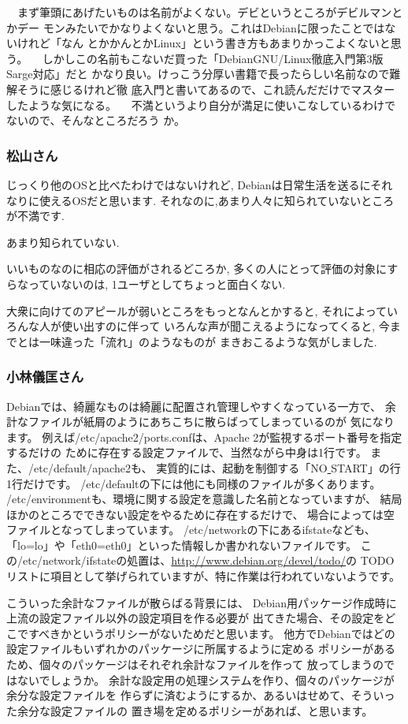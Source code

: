 \documentclass[mingoth]{jsarticle}
\begin{document}
　まず筆頭にあげたいものは名前がよくない。デビというところがデビルマンとかデー
モンみたいでかなりよくないと思う。これはDebianに限ったことではないけれど「なん
とかかんとかLinux」という書き方もあまりかっこよくないと思う。
　しかしこの名前もこないだ買った「DebianGNU/Linux徹底入門第3版Sarge対応」だと
かなり良い。けっこう分厚い書籍で長ったらしい名前なので難解そうに感じるけれど徹
底入門と書いてあるので、これ読んだだけでマスターしたような気になる。
　不満というより自分が満足に使いこなしているわけでないので、そんなところだろう
か。

\subsubsection{松山さん}
じっくり他のOSと比べたわけではないけれど,
Debianは日常生活を送るにそれなりに使えるOSだと思います.
それなのに,あまり人々に知られていないところが不満です.

あまり知られていない.

いいものなのに相応の評価がされるどころか,
多くの人にとって評価の対象にすらなっていないのは,
1ユーザとしてちょっと面白くない.

大衆に向けてのアピールが弱いところをもっとなんとかすると,
それによっていろんな人が使い出すのに伴って
いろんな声が聞こえるようになってくると,
今までとは一味違った「流れ」のようなものが
まきおこるような気がしました.	

\subsubsection{小林儀匡さん}

Debianでは、綺麗なものは綺麗に配置され管理しやすくなっている一方で、
余計なファイルが紙屑のようにあちこちに散らばってしまっているのが
気になります。
例えば/etc/apache2/ports.confは、Apache 2が監視するポート番号を指定するだけの
ために存在する設定ファイルで、当然ながら中身は1行です。
また、/etc/default/apache2も、
実質的には、起動を制御する「NO\underline{ }START」の行1行だけです。
/etc/defaultの下には他にも同様のファイルが多くあります。
/etc/environmentも、環境に関する設定を意識した名前となっていますが、
結局ほかのところでできない設定をやるために存在するだけで、
場合によっては空ファイルとなってしまっています。
/etc/networkの下にあるifstateなども、
「lo=lo」や「eth0=eth0」といった情報しか書かれないファイルです。
この/etc/network/ifstateの処置は、\url{http://www.debian.org/devel/todo/}の
TODOリストに項目として挙げられていますが、特に作業は行われていないようです。

こういった余計なファイルが散らばる背景には、
Debian用パッケージ作成時に上流の設定ファイル以外の設定項目を作る必要が
出てきた場合、その設定をどこですべきかというポリシーがないためだと思います。
他方でDebianではどの設定ファイルもいずれかのパッケージに所属するように定める
ポリシーがあるため、個々のパッケージはそれぞれ余計なファイルを作って
放ってしまうのではないでしょうか。
余計な設定用の処理システムを作り、個々のパッケージが余分な設定ファイルを
作らずに済むようにするか、あるいはせめて、そういった余分な設定ファイルの
置き場を定めるポリシーがあれば、と思います。
\end{document}
